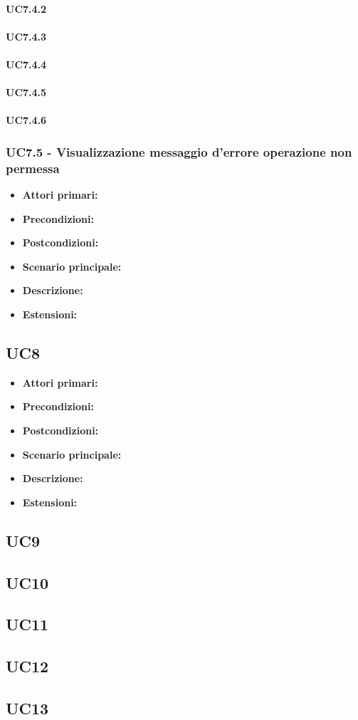 \paragraph{UC7.4.2 }
\paragraph{UC7.4.3 }
\paragraph{UC7.4.4 }
\paragraph{UC7.4.5 }
\paragraph{UC7.4.6 }
\subsubsection{UC7.5 - Visualizzazione messaggio d'errore operazione non permessa}
\begin{itemize}
	\item 	\textbf{Attori primari:}
	\item 	\textbf{Precondizioni:}
	\item 	\textbf{Postcondizioni:}
	\item 	\textbf{Scenario principale:}
	\item 	\textbf{Descrizione:}
	\item 	\textbf{Estensioni:}
\end{itemize}
\subsection{UC8}
\begin{itemize}
	\item 	\textbf{Attori primari:}
	\item 	\textbf{Precondizioni:}
	\item 	\textbf{Postcondizioni:}
	\item 	\textbf{Scenario principale:}
	\item 	\textbf{Descrizione:}
	\item 	\textbf{Estensioni:}
\end{itemize}
\subsection{UC9}
\subsection{UC10}
\subsection{UC11}
\subsection{UC12}
\subsection{UC13}

